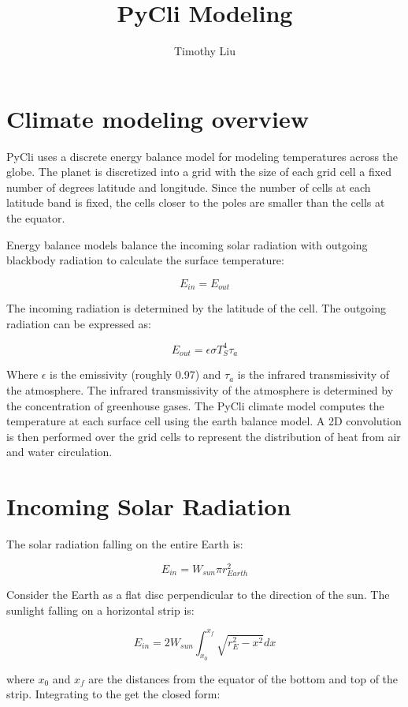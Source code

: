 \documentclass[12pt]{article} %
\title{PyCli Modeling}
\author{Timothy Liu}
\begin{document}
\maketitle

\section{Climate modeling overview}
PyCli uses a discrete energy balance model for modeling temperatures across the globe. The planet is discretized into a grid with the size of each grid cell a fixed number of degrees latitude and longitude. Since the number of cells at each latitude band is fixed, the cells closer to the poles are smaller than the cells at the equator.

Energy balance models balance the incoming solar radiation with outgoing blackbody radiation to calculate the surface temperature:

$$E_{in} = E_{out}$$

The incoming radiation is determined by the latitude of the cell. The outgoing radiation can be expressed as:

$$E_{out} = \epsilon \sigma T_{S}^{4} \tau _{a}$$

Where $\epsilon$ is the emissivity (roughly 0.97) and $\tau _{a}$ is the infrared transmissivity of the atmosphere. The infrared transmissivity of the atmosphere is determined by the concentration of greenhouse gases. The PyCli climate model computes the temperature at each surface cell using the earth balance model. A 2D convolution is then performed over the grid cells to represent the distribution of heat from air and water circulation.


\section{Incoming Solar Radiation}

The solar radiation falling on the entire Earth is:

$$E_{in} = W_{sun} \pi r_{Earth}^2$$

Consider the Earth as a flat disc perpendicular to the direction of the sun. The sunlight falling on a horizontal strip is:

$$E_{in} = 2 W_{sun} \int_{x_0}^{x_f} \sqrt{r_{E}^2 - x^2} dx$$


where $x_0$ and $x_f$ are the distances from the equator of the bottom and top of the strip. Integrating to the get the closed form:
\end{document}
